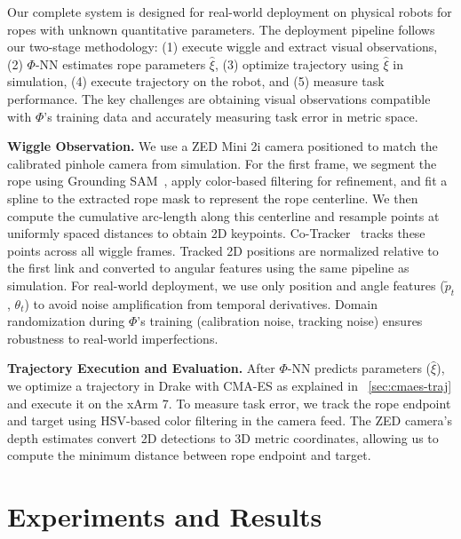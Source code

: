 \documentclass[conference]{IEEEtran}
\begin{document}
Our complete system is designed for real-world deployment on physical robots for ropes with unknown quantitative parameters. The deployment pipeline follows our two-stage methodology: (1) execute wiggle and extract visual observations, (2) $\Phi$-NN estimates rope parameters $\hat{\xi}$, (3) optimize trajectory using $\hat{\xi}$ in simulation, (4) execute trajectory on the robot, and (5) measure task performance. The key challenges are obtaining visual observations compatible with $\Phi$'s training data and accurately measuring task error in metric space.

\textbf{Wiggle Observation.} We use a ZED Mini 2i camera positioned to match the calibrated pinhole camera from simulation. For the first frame, we segment the rope using Grounding SAM~\cite{ren2024grounded}, apply color-based filtering for refinement, and fit a spline to the extracted rope mask to represent the rope centerline. We then compute the cumulative arc-length along this centerline and resample points at uniformly spaced distances to obtain 2D keypoints. Co-Tracker~\cite{karaev2410cotracker3} tracks these points across all wiggle frames. Tracked 2D positions are normalized relative to the first link and converted to angular features using the same pipeline as simulation. For real-world deployment, we use only position and angle features ($\tilde{p}_t$, $\theta_t$) to avoid noise amplification from temporal derivatives. Domain randomization during $\Phi$'s training (calibration noise, tracking noise) ensures robustness to real-world imperfections.

\textbf{Trajectory Execution and Evaluation.} After $\Phi$-NN predicts parameters ($\hat{\xi}$), we optimize a trajectory in Drake with CMA-ES as explained in ~\ref{sec:cmaes-traj} and execute it on the xArm 7. To measure task error, we track the rope endpoint and target using HSV-based color filtering in the camera feed. The ZED camera's depth estimates convert 2D detections to 3D metric coordinates, allowing us to compute the minimum distance between rope endpoint and target.


\section{Experiments and Results}
\end{document}
